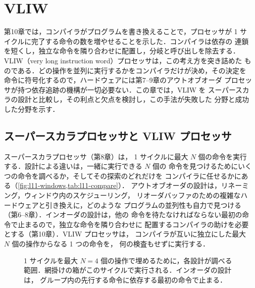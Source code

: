 \documentclass[../main.tex]{subfiles}
\begin{document}
\chapter{VLIW}

第10章では，コンパイラがプログラムを書き換えることで，プロセッサが
1 サイクルに完了する命令の数を増やせることを示した．コンパイラは依存の
連鎖を短くし，独立な命令を隣り合わせに配置し，分岐と呼び出しを除去する．
VLIW（very long instruction word）プロセッサは，この考え方を突き詰めた
ものである．どの操作を並列に実行するかをコンパイラだけが決め，その決定を
命令に符号化するので，ハードウェアには第7--9章のアウトオブオーダ
プロセッサが持つ依存追跡の機構が一切必要ない．この章では，VLIW を
スーパースカラの設計と比較し，その利点と欠点を検討し，この手法が失敗した
分野と成功した分野を示す．

\section{スーパースカラプロセッサと VLIW プロセッサ}
\label{sec:l11-superscalar-vs-vliw}

スーパースカラプロセッサ（第8章）は，
1 サイクルに最大 $N$ 個の命令を実行する．設計による違いは，一緒に実行できる $N$ 個の
命令を見つけるためにいくつの命令を調べるか，そしてその探索のどれだけを
コンパイラに任せるかにある（\cref{fig:l11-windows,tab:l11-compare}）．
アウトオブオーダの設計は，リネーミング，ウィンドウ内のスケジューリング，
リオーダバッファのための複雑なハードウェアと引き換えに，どのような
プログラムの並列性も自力で見つける（第6--8章）．インオーダの設計は，他の
命令を待たなければならない最初の命令で止まるので，独立な命令を隣り合わせに
配置するコンパイラの助けを必要とする（第10章）．VLIW プロセッサは，
コンパイラが互いに独立にした最大 $N$ 個の操作からなる 1 つの命令を，
何の検査もせずに実行する．

\begin{figure}[htbp]
  \centering
  
  \caption{1 サイクルを最大 $N=4$ 個の操作で埋めるために，各設計が調べる
    範囲．網掛けの箱がこのサイクルで実行される．インオーダの設計は，
    グループ内の先行する命令に依存する最初の命令で止まる．}
  \label{fig:l11-windows}
\end{figure}
\end{document}
